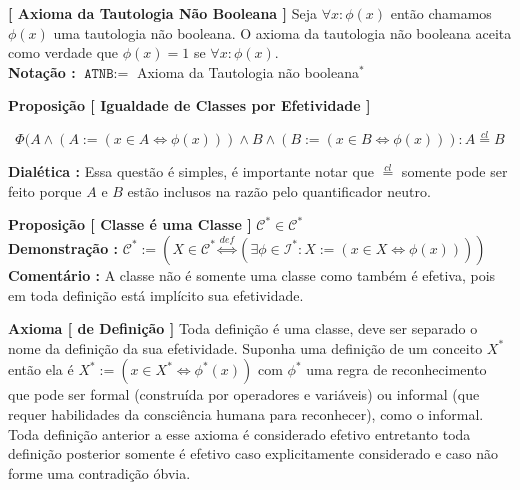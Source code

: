 \documentclass[10pt,a4paper]{report}
\begin{document}
\textbf{[ Axioma da Tautologia Não Booleana ]} Seja $ \forall x : \phi(x) $ então chamamos $\phi(x)$ uma tautologia não booleana. O axioma da tautologia não booleana aceita como verdade que $\phi(x)=1$ se $\forall x : \phi(x)$.\\

\textbf{Notação :} $\texttt{ATNB} :=$ Axioma da Tautologia não booleana$^*$

\hspace{\baselineskip}

\textbf{Proposição [ Igualdade de Classes por Efetividade ]}

$$ \Phi( A \wedge ( A:= ( x \in A \iff \phi(x)) ) \wedge B \wedge ( B:=( x \in B \iff \phi(x) )  ) : A \overset{cl}{=} B $$

\textbf{Dialética :} Essa questão é simples, é importante notar que $\overset{cl}{=}$ somente pode ser feito porque $A$ e $B$ estão inclusos na razão pelo quantificador neutro.

\hspace{\baselineskip}

\textbf{Proposição [ Classe é uma Classe ]} $ \mathcal{C}^* \in \mathcal{C}^* $\\

\textbf{Demonstração :} $ \mathcal{C}^* := ( X \in \mathcal{C}^* \overset{def}{\iff}  ( \exists \phi \in \mathcal{I}^* : X:=( x \in X \iff \phi(x) ) ) ) $\\

\textbf{Comentário :} A classe não é somente uma classe como também é efetiva, pois em toda definição está implícito sua efetividade.

\hspace{\baselineskip}

\textbf{Axioma [ de Definição ]} Toda definição é uma classe, deve ser separado o nome da definição da sua efetividade. Suponha uma definição de um conceito $X^*$ então ela é $ X^* := ( x \in X^* \iff \phi^*(x) ) $ com $\phi^*$ uma regra de reconhecimento que pode ser formal (construída por operadores e variáveis) ou informal (que requer habilidades da consciência humana para reconhecer), como o informal. Toda definição anterior a esse axioma é considerado efetivo entretanto toda definição posterior somente é efetivo caso explicitamente considerado e caso não forme uma contradição óbvia. \\
\end{document}

